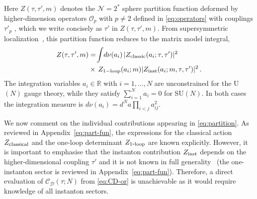 \documentclass[aps,prl,twocolumn, longbibliography,footinbib,superscriptaddress, preprintnumbers]{revtex4-1}
\newcommand{\<}{\langle}
\renewcommand{\>}{\rangle}
\begin{document}
Here $Z (\tau, \tau', m)$ denotes the $\mathcal{N}=2^*$ sphere partition function deformed by higher-dimension operators $\mathcal{O}_p$ with $p\neq2$ defined in \eqref{eq:operators} with couplings $\tau'_p$ , which we write concisely as $\tau'$ in $Z  (\tau, \tau', m)$. From supersymmetric localization~\cite{Pestun:2007rz}, this  partition function reduces to the matrix model integral,
\begin{align} \label{eq:partition}
Z  (\tau, \tau', m)  &=\! \int \! d \nu(a_i)   \, |Z_{\rm classic}(a_i; \tau, \tau')|^2 \\
& \times\,  Z_{\rm 1-loop}(a_i; m)| Z_{\rm inst}(a_i; m, \tau, \tau') |^2 \, .  \nonumber
\end{align}
The integration variables $a_i\in \mathbb{R}$ with $i=1,...,N$ are unconstrained for the U$(N)$ gauge theory, while they satisfy $ \sum_{i=1}^N a_i=0$ for SU$(N)$.
In both cases the integration measure is  $d \nu(a_i) = d^{N} \! a   \prod_{i<j} a_{ij}^2$.

We now comment on the individual contributions appearing in \eqref{eq:partition}. As reviewed in Appendix~\ref{eq:part-fun}, the expressions for the classical action $Z_{\rm classical}$ and the one-loop determinant $Z_{\rm 1\mbox{-}loop}$ are known explicitly. However, it is important to emphasise that the instanton contribution $Z_{\rm inst}$ \cite{Nekrasov:2002qd} depends on the higher-dimensional coupling $\tau'$ and it is not known in full generality~\cite{Gerchkovitz:2016gxx} (the one-instanton sector is reviewed in Appendix~\ref{eq:part-fun}). Therefore, a direct evaluation of $\mathcal{C}_{\mathcal{D}}(\tau; N)$ from \eqref{eq:CD-or} is unachievable as it would require knowledge of all instanton sectors.
\end{document}
